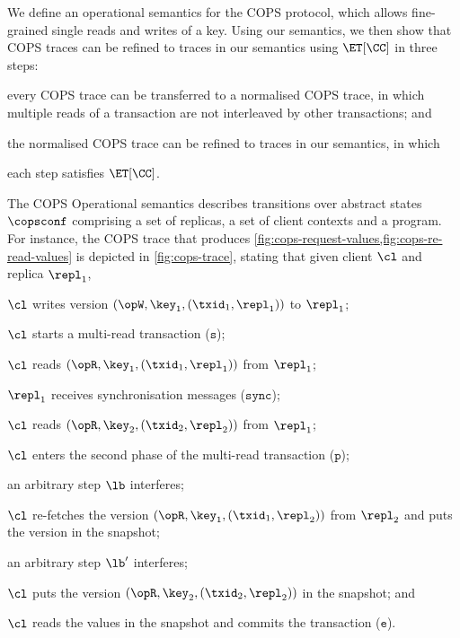 We define an operational semantics for the COPS protocol, which allows fine-grained single reads and writes of a key.
Using our semantics, we then show that COPS traces can be refined to traces in our semantics using \( \ET[\CC] \) in three steps:
\begin{enumerate*}
	\item every COPS trace can be transferred to a normalised COPS trace, 
in which multiple reads of a transaction are not interleaved by other transactions; and
	\item the normalised COPS trace can be refined to traces in our semantics, in which 
	\item each step satisfies \( \ET[\CC] \).
\end{enumerate*}

The COPS Operational semantics
describes transitions over abstract states \( \copsconf \) comprising a set of replicas,
a set of client contexts and a program.
For instance, the COPS trace that produces \cref{fig:cops-request-values,fig:cops-re-read-values} is depicted in \cref{fig:cops-trace}, stating that
given client \(\cl\) and replica \( \repl_1 \),
\begin{enumerate*}
	\item \( \cl \) writes version \( (\opW,\key_1, (\txid_1,\repl_1)) \) to $\repl_1$;
	\item \( \cl \) starts a multi-read transaction (\( \mathtt{s} \));
	\item \( \cl \) reads \( (\opR,\key_1, (\txid_1,\repl_1)) \) from $\repl_1$;
	\item \( \repl_1 \) receives synchronisation messages (\(\mathtt{sync}\));
	\item \( \cl \) reads \( (\opR,\key_2, (\txid_2,\repl_2)) \) from $\repl_1$;
	\item \( \cl \) enters the second phase of the multi-read transaction (\(\mathtt{p}\));
	\item an arbitrary step \( \lb \) interferes;
	\item \( \cl \) re-fetches the version \( (\opR,\key_1, (\txid_1,\repl_2)) \) from \( \repl_2 \) and puts the version in the snapshot;
	\item an arbitrary step \( \lb' \) interferes;
	\item \( \cl \) puts the version \( (\opR,\key_2, (\txid_2,\repl_2)) \) in the snapshot; and
	\item \( \cl \) reads the values in the snapshot and commits the transaction (\(\mathtt{e}\)).
\end{enumerate*}


